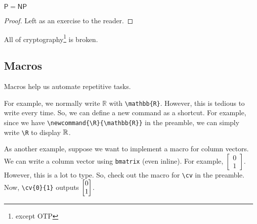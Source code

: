 \documentclass{article}
\begin{document}
\begin{theorem}
    $\mathsf{P}=\mathsf{NP}$
\end{theorem}

\begin{proof}
    Left as an exercise to the reader.
\end{proof}

\begin{corollary}
    All of cryptography\footnote{except OTP} is broken.
\end{corollary}

\subsection{Macros}

Macros help us automate repetitive tasks.

For example, we normally write $\mathbb{R}$ with \texttt{\textbackslash mathbb\{R\}}. However, this is tedious to write every time. So, we can define a new command as a shortcut. For example, since we have \texttt{\textbackslash newcommand\{\textbackslash R\}\{\textbackslash mathbb\{R\}\}} in the preamble, we can simply write \texttt{\textbackslash R} to display $\mathbb{R}$.

As another example, suppose we want to implement a macro for column vectors. We can write a column vector using \texttt{bmatrix} (even inline). For example, $\begin{bmatrix}0\\1\end{bmatrix}$. However, this is a lot to type. So, check out the macro for \texttt{\textbackslash cv} in the preamble. Now, \texttt{\textbackslash cv\{0\}\{1\}} outputs $\begin{bmatrix}0\\1\end{bmatrix}$.

\newpage
\printbibliography
\end{document}
